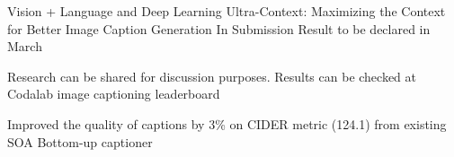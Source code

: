 \begin{cventries}
  \cventry
    {Vision + Language and Deep Learning} %
    {Ultra-Context: Maximizing the Context for Better Image Caption Generation} %
    {In Submission} %
    {Result to be declared in March} %
    {
      \begin{cvitems} %
        \item {Research can be shared for discussion purposes. Results can be checked at Codalab image captioning leaderboard}
        \item {Improved the quality of captions by 3\% on CIDER metric (124.1) from existing SOA Bottom-up captioner}  
      \end{cvitems} 
    }
\end{cventries}
